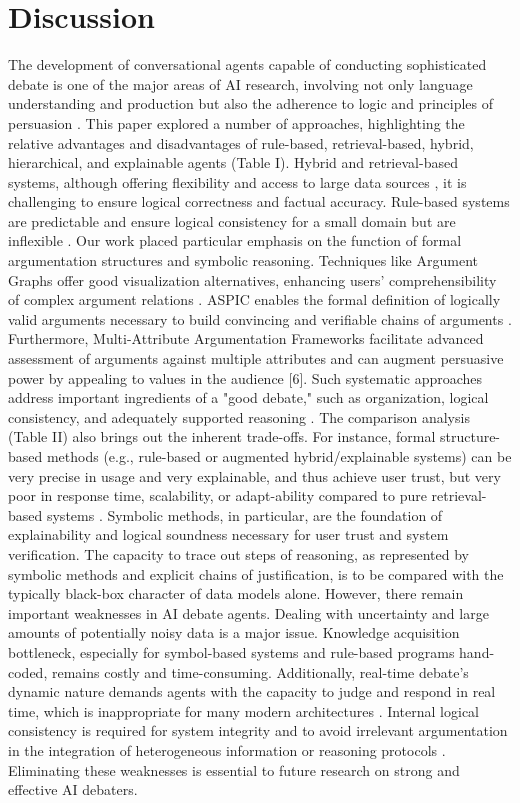 \documentclass[conference]{IEEEtran}
\begin{document}
\section{Discussion}
The development of conversational agents capable of conducting sophisticated debate is one of the major areas of AI research, involving not only language understanding and production but also the adherence to logic and principles of persuasion \cite{rakshit2019debbie}. This paper explored a number of approaches, highlighting the relative advantages and disadvantages of rule-based, retrieval-based, hybrid, hierarchical, and explainable agents (Table I). Hybrid and retrieval-based systems, although offering flexibility and access to large data sources \cite{kulatska2019arguebot}, it is challenging to ensure logical correctness and factual accuracy. Rule-based systems are predictable and ensure logical consistency for a small domain but are inflexible \cite{b12}.
Our work placed particular emphasis on the function of formal argumentation structures and symbolic reasoning. Techniques like Argument Graphs offer good visualization alternatives, enhancing users' comprehensibility of complex argument relations \cite{chalaguine2020persuasive}\cite{engelmann2022argumentation}. ASPIC enables the formal definition of logically valid arguments necessary to build convincing and verifiable chains of arguments \cite{engelmann2022argumentation}. Furthermore, Multi-Attribute Argumentation Frameworks facilitate advanced assessment of arguments against multiple attributes and can augment persuasive power by appealing to values in the audience [6]. Such systematic approaches address important ingredients of a "good debate," such as organization, logical consistency, and adequately supported reasoning \cite{b7}\cite{b8}.
The comparison analysis (Table II) also brings out the inherent trade-offs. For instance, formal structure-based methods (e.g., rule-based or augmented hybrid/explainable systems) can be very precise in usage and very explainable, and thus achieve user trust, but very poor in response time, scalability, or adapt-ability compared to pure retrieval-based systems \cite{b15}. Symbolic methods, in particular, are the foundation of explainability and logical soundness necessary for user trust and system verification. The capacity to trace out steps of reasoning, as represented by symbolic methods and explicit chains of justification, is to be compared with the typically black-box character of data models alone.
However, there remain important weaknesses in AI debate agents. Dealing with uncertainty and large amounts of potentially noisy data is a major issue. Knowledge acquisition bottleneck, especially for symbol-based systems and rule-based programs hand-coded, remains costly and time-consuming. Additionally, real-time debate's dynamic nature demands agents with the capacity to judge and respond in real time, which is inappropriate for many modern architectures \cite{b11}. Internal logical consistency is required for system integrity and to avoid irrelevant argumentation in the integration of heterogeneous information or reasoning protocols \cite{b10}. Eliminating these weaknesses is essential to future research on strong and effective AI debaters.
\end{document}
